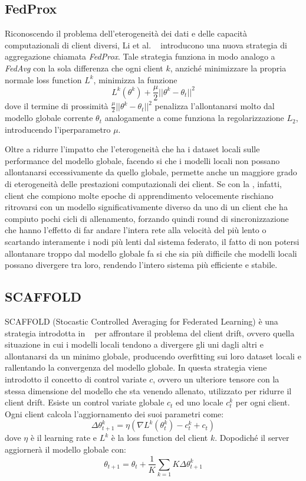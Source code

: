 \subsection{FedProx}
Riconoscendo il problema dell'eterogeneità dei dati e delle capacità 
computazionali di client diversi, Li et al. ~\cite{li2018FederatedOI}
introducono una nuova strategia di aggregazione chiamata 
\textit{FedProx}. Tale strategia funziona in modo analogo a 
\textit{FedAvg} con la sola differenza che ogni client \(k\), anziché 
minimizzare la propria normale loss function \(L^k\), minimizza la 
funzione
\[
L^k(\theta^k) + \frac{\mu}{2} ||\theta^k - \theta_t||^2
\]
dove il termine di prossimità \(\frac{\mu}{2} ||\theta^k - \theta_t||^2\) 
penalizza l'allontanarsi molto dal modello globale corrente
\(\theta_t\) analogamente a come funziona la regolarizzazione \(L_2\),
introducendo l'iperparametro \(\mu\).

Oltre a ridurre l'impatto che l'eterogeneità che ha i dataset locali 
sulle performance del modello globale, facendo si che i modelli locali 
non possano allontanarsi eccessivamente da quello globale, permette 
anche un maggiore grado di eterogeneità delle prestazioni computazionali 
dei client. Se con la , infatti, client che compiono 
molte epoche di apprendimento velocemente rischiano ritrovarsi con un 
modello significativamente diverso da uno di un client che ha compiuto
pochi cicli di allenamento, forzando quindi round di sincronizzazione
che hanno l'effetto di far andare l'intera rete alla velocità del più
lento o scartando interamente i nodi più lenti dal sistema federato, 
il fatto di non potersi allontanare troppo dal modello globale fa si
che sia più difficile che modelli locali possano divergere tra loro,
rendendo l'intero sistema più efficiente e stabile.


\subsection{SCAFFOLD}
SCAFFOLD (Stocastic Controlled Averaging for Federated Learning) è una 
strategia introdotta in ~\cite{Karimireddy2020scaffold} per 
affrontare il problema del client drift, ovvero quella situazione in 
cui i modelli locali tendono a divergere gli uni dagli altri e allontanarsi 
da un minimo globale, producendo overfitting sui loro dataset locali 
e rallentando la convergenza del modello globale.
In questa strategia viene introdotto il concetto di control variate
\(c\), ovvero un ulteriore tensore con la stessa dimensione del modello 
che sta venendo allenato, utilizzato per ridurre il client drift. 
Esiste un control variate globale \(c_t\) ed uno locale \(c_t^k\) per 
ogni client. Ogni client calcola l'aggiornamento dei suoi parametri come:
\[
\Delta\theta_{t+1}^k = \eta (\nabla L^k(\theta_t^k) -c_t^k +c_t)
\]
dove \(\eta\) è il learning rate e \(L^k\) è la loss function del 
client \(k\). Dopodiché il server aggiornerà il modello globale con:
\[
\theta_{t+1} = \theta_t + \frac{1}{K} \sum_{k=1}{K} \Delta\theta_{t+1}^k
\]

